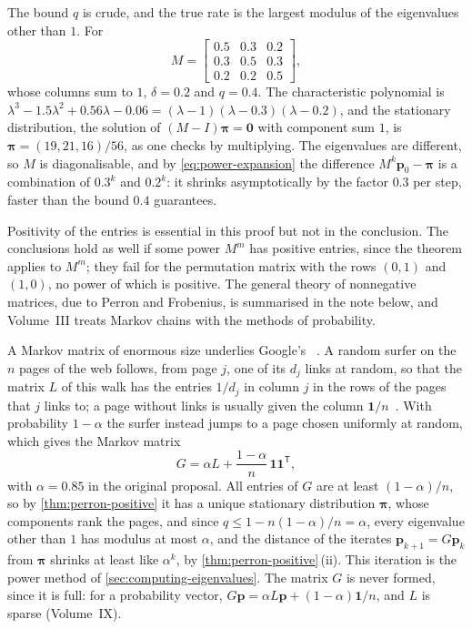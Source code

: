 The bound $q$ is crude, and the true rate is the largest modulus of the eigenvalues other than $1$. For
\[
M=\begin{bmatrix}0.5&0.3&0.2\\0.3&0.5&0.3\\0.2&0.2&0.5\end{bmatrix},
\]
whose columns sum to $1$, $\delta=0.2$ and $q=0.4$. The characteristic polynomial is $\lambda^3-1.5\lambda^2+0.56\lambda-0.06=(\lambda-1)(\lambda-0.3)(\lambda-0.2)$, and the stationary distribution, the solution of $(M-I)\boldsymbol\pi=\mathbf 0$ with component sum $1$, is $\boldsymbol\pi=(19,21,16)/56$, as one checks by multiplying. The eigenvalues are different, so $M$ is diagonalisable, and by \eqref{eq:power-expansion} the difference $M^k\mathbf p_0-\boldsymbol\pi$ is a combination of $0.3^k$ and $0.2^k$: it shrinks asymptotically by the factor $0.3$ per step, faster than the bound $0.4$ guarantees.

Positivity of the entries is essential in this proof but not in the conclusion. The conclusions hold as well if some power $M^m$ has positive entries, since the theorem applies to $M^m$; they fail for the permutation matrix with the rows $(0,1)$ and $(1,0)$, no power of which is positive. The general theory of nonnegative matrices, due to Perron and Frobenius, is summarised in the note below, and Volume~III treats Markov chains with the methods of probability.

A Markov matrix of enormous size underlies Google's ~\cite{brin1998}. A random surfer on the $n$ pages of the web follows, from page $j$, one of its $d_j$ links at random, so that the matrix $L$ of this walk has the entries $1/d_j$ in column $j$ in the rows of the pages that $j$ links to; a page without links is usually given the column $\mathbf 1/n$~\cite{langville2006}. With probability $1-\alpha$ the surfer instead jumps to a page chosen uniformly at random, which gives the Markov matrix
\[
G=\alpha L+\frac{1-\alpha}n\,\mathbf 1\mathbf 1^{\mathsf T},
\]
with $\alpha=0.85$ in the original proposal. All entries of $G$ are at least $(1-\alpha)/n$, so by \cref{thm:perron-positive} it has a unique stationary distribution $\boldsymbol\pi$, whose components rank the pages, and since $q\le1-n(1-\alpha)/n=\alpha$, every eigenvalue other than $1$ has modulus at most $\alpha$, and the distance of the iterates $\mathbf p_{k+1}=G\mathbf p_k$ from $\boldsymbol\pi$ shrinks at least like $\alpha^k$, by \cref{thm:perron-positive}\,(ii). This iteration is the power method of \cref{sec:computing-eigenvalues}. The matrix $G$ is never formed, since it is full: for a probability vector, $G\mathbf p=\alpha L\mathbf p+(1-\alpha)\mathbf 1/n$, and $L$ is sparse (Volume~IX).

